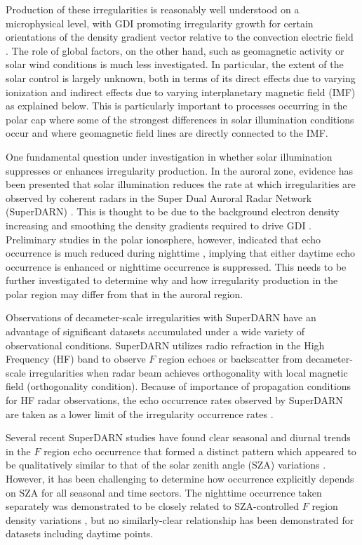 Production of these irregularities is reasonably well understood on a microphysical level, with GDI promoting irregularity growth for certain orientations of the density gradient vector relative to the convection electric field \citep{Keskinen1982a,Keskinen1982b,Makarevich2014c}. The role of global factors, on the other hand, such as geomagnetic activity or solar wind conditions is much less investigated. In particular, the extent of the solar control is largely unknown, both in terms of its direct effects due to varying ionization and  indirect effects due to varying interplanetary magnetic field (IMF) as explained below. This is particularly important to processes occurring in the polar cap where some of the strongest differences in solar illumination conditions occur and where geomagnetic field lines are directly connected to the IMF.



One fundamental question under investigation in whether solar illumination suppresses or enhances irregularity production. In the auroral zone, evidence has been presented that solar illumination reduces the rate at which irregularities are observed by coherent radars in the Super Dual Auroral Radar Network (SuperDARN) \citep{Ruohoniemi1997,Koustov2004}.  This is thought to be due to the background electron density increasing and smoothing the density gradients required to drive GDI \citep{Ruohoniemi1997,Koustov2004}. Preliminary studies in the polar ionosphere, however, indicated that echo occurrence is much reduced during nighttime \citep{Bristow2011}, implying that either daytime echo occurrence is enhanced or nighttime occurrence is suppressed. This needs to be further investigated to determine why and how irregularity production in the polar region may differ from that in the auroral region.

Observations of decameter-scale irregularities with SuperDARN have an advantage of significant datasets accumulated under a wide variety of observational conditions. SuperDARN utilizes radio refraction in the High Frequency (HF) band to observe \(F\) region echoes or backscatter from decameter-scale irregularities when radar beam achieves orthogonality with local magnetic field (orthogonality condition). Because of importance of propagation conditions for HF radar observations, the echo occurrence rates observed by SuperDARN are taken as a lower limit of the irregularity occurrence rates \citep{Chisham2007}.


Several recent SuperDARN studies have found clear seasonal and diurnal trends in the \(F\) region echo occurrence that formed a distinct pattern which appeared to be qualitatively similar to that of the solar zenith angle (SZA) variations \citep{Kane2012,Ghezelbash2014a,Ghezelbash2014b}. However, it has been challenging to determine how occurrence explicitly depends on SZA for all seasonal and time sectors. The nighttime occurrence taken separately was demonstrated to be closely related to SZA-controlled \(F\) region density  variations \citep{Kane2012}, but no similarly-clear relationship has been demonstrated for datasets including daytime points.

